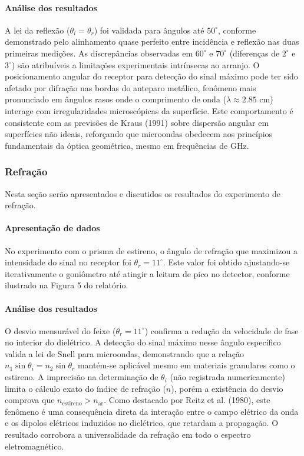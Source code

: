 \documentclass[12pt]{article}
\begin{document}
\paragraph{Análise dos resultados}
A lei da reflexão (\(\theta_i = \theta_r\)) foi
validada para ângulos até \(50^\circ\), conforme demonstrado pelo
alinhamento quase perfeito entre incidência e reflexão nas duas primeiras
medições. As discrepâncias observadas em \(60^\circ\) e \(70^\circ\)
(diferenças de \(2^\circ\) e \(3^\circ\)) são atribuíveis a
limitações experimentais intrínsecas ao arranjo. O posicionamento
angular do receptor para detecção do sinal máximo pode ter sido
afetado por difração nas bordas do anteparo metálico, fenômeno mais
pronunciado em ângulos rasos onde o comprimento de onda (\(\lambda
\approx 2.85\) cm) interage com irregularidades microscópicas da
superfície. Este comportamento é consistente com as previsões de
Kraus (1991) sobre dispersão angular em superfícies não ideais,
reforçando que microondas obedecem aos princípios fundamentais da
óptica geométrica, mesmo em frequências de GHz.
\subsubsection{Refração}
Nesta seção serão apresentados e discutidos os resultados do experimento de
refração.
\paragraph{Apresentação de dados}
No experimento com o prisma de estireno, o ângulo de refração que
maximizou a intensidade do sinal no receptor foi \(\theta_r =
11^\circ\). Este valor foi obtido ajustando-se iterativamente o
goniômetro até atingir a leitura de pico no detector, conforme
ilustrado na Figura 5 do relatório.

\paragraph{Análise dos resultados}
O desvio mensurável do feixe (\(\theta_r = 11^\circ\)) confirma a
redução da velocidade de fase no interior do dielétrico. A detecção
do sinal máximo nesse ângulo específico valida a lei de Snell para
microondas, demonstrando que a relação \(n_1 \sin \theta_i = n_2 \sin
\theta_r\) mantém-se aplicável mesmo em materiais granulares como o
estireno. A imprecisão na determinação de \(\theta_i\) (não
registrada numericamente) limita o cálculo exato do índice de
refração (\(n\)), porém a existência do desvio comprova que
\(n_{\text{estireno}} > n_{\text{ar}}\). Como destacado por Reitz et
al. (1980), este fenômeno é uma consequência direta da interação
entre o campo elétrico da onda e os dipolos elétricos induzidos no
dielétrico, que retardam a propagação. O resultado corrobora a
universalidade da refração em todo o espectro eletromagnético.
\end{document}
